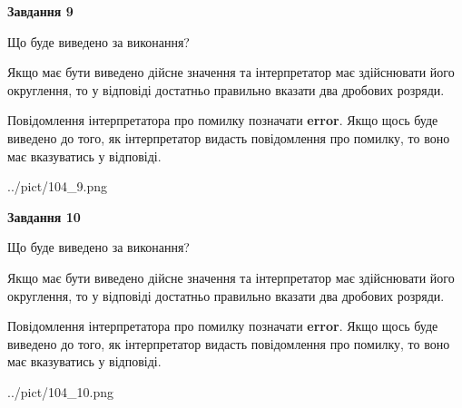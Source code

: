 \documentclass[12pt, ukrainian]{article}
\begin{document}
{\begin {Large}
{\begin {center}\textbf{Завдання 9}\end {center}}\par
Що буде виведено за виконання? \par

Якщо має бути виведено дійсне значення та інтерпретатор має здійснювати його округлення, 
то у відповіді достатньо правильно вказати два дробових розряди.

Повідомлення інтерпретатора про помилку позначати \textbf{error}.
Якщо щось буде виведено до того, як інтерпретатор видасть повідомлення про помилку, 
то воно має вказуватись у відповіді. \par

\begin{center}
	{../pict/104_9.png}
\end{center}
\newpage

{\begin {center}\textbf{Завдання 10}\end {center}}\par
Що буде виведено за виконання? \par

Якщо має бути виведено дійсне значення та інтерпретатор має здійснювати його округлення, 
то у відповіді достатньо правильно вказати два дробових розряди.

Повідомлення інтерпретатора про помилку позначати \textbf{error}.
Якщо щось буде виведено до того, як інтерпретатор видасть повідомлення про помилку, 
то воно має вказуватись у відповіді. \par

\begin{center}
	{../pict/104_10.png}
\end{center}
\newpage

\end {Large}}
\end{document}
